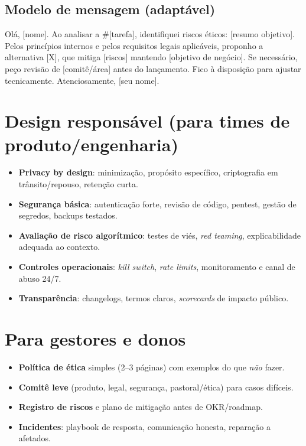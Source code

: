 \subsection*{Modelo de mensagem (adaptável)}
\begin{tcolorbox}[title=Solicitação de revisão ética,breakable]
Olá, [nome]. Ao analisar a \#[tarefa], identifiquei riscos éticos: [resumo objetivo].
Pelos princípios internos e pelos requisitos legais aplicáveis, proponho a alternativa [X], que mitiga [riscos] mantendo [objetivo de negócio].
Se necessário, peço revisão de [comitê/área] antes do lançamento. Fico à disposição para ajustar tecnicamente.
Atenciosamente, [seu nome].
\end{tcolorbox}

\section{Design responsável (para times de produto/engenharia)}
\begin{checklist}[title={Boas práticas essenciais}]
\begin{itemize}[leftmargin=*,noitemsep]
  \item \textbf{Privacy by design}: minimização, propósito específico, criptografia em trânsito/repouso, retenção curta.
  \item \textbf{Segurança básica}: autenticação forte, revisão de código, pentest, gestão de segredos, backups testados.
  \item \textbf{Avaliação de risco algorítmico}: testes de viés, \emph{red teaming}, explicabilidade adequada ao contexto.
  \item \textbf{Controles operacionais}: \emph{kill switch}, \emph{rate limits}, monitoramento e canal de abuso 24/7.
  \item \textbf{Transparência}: changelogs, termos claros, \emph{scorecards} de impacto público.
\end{itemize}
\end{checklist}

\section{Para gestores e donos}
\begin{checklist}[title={Governança em 1 página}]
\begin{itemize}[leftmargin=*,noitemsep]
  \item \textbf{Política de ética} simples (2--3 páginas) com exemplos do que \emph{não} fazer.
  \item \textbf{Comitê leve} (produto, legal, segurança, pastoral/ética) para casos difíceis.
  \item \textbf{Registro de riscos} e plano de mitigação antes de OKR/roadmap.
  \item \textbf{Incidentes}: playbook de resposta, comunicação honesta, reparação a afetados.
\end{itemize}
\end{checklist}

